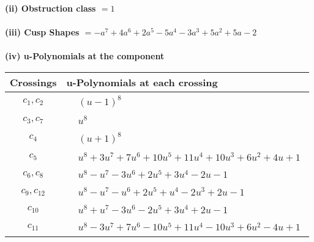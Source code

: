 \documentclass[1p]{elsarticle_modified}
\theoremstyle{definition}
\begin{document}
\flushleft \textbf{(ii) Obstruction class $= 1$}\\~\\
\flushleft \textbf{(iii) Cusp Shapes $= - a^7+4 a^6+2 a^5-5 a^4-3 a^3+5 a^2+5 a-2$}\\~\\
\newpage\renewcommand{\arraystretch}{1}
\flushleft \textbf{(iv) u-Polynomials at the component}\newline \\
\begin{tabular}{m{50pt}|m{274pt}}
Crossings & \hspace{64pt}u-Polynomials at each crossing \\
\hline $$\begin{aligned}c_{1},c_{2}\end{aligned}$$&$\begin{aligned}
&(u-1)^8
\end{aligned}$\\
\hline $$\begin{aligned}c_{3},c_{7}\end{aligned}$$&$\begin{aligned}
&u^8
\end{aligned}$\\
\hline $$\begin{aligned}c_{4}\end{aligned}$$&$\begin{aligned}
&(u+1)^8
\end{aligned}$\\
\hline $$\begin{aligned}c_{5}\end{aligned}$$&$\begin{aligned}
&u^8+3 u^7+7 u^6+10 u^5+11 u^4+10 u^3+6 u^2+4 u+1
\end{aligned}$\\
\hline $$\begin{aligned}c_{6},c_{8}\end{aligned}$$&$\begin{aligned}
&u^8- u^7-3 u^6+2 u^5+3 u^4-2 u-1
\end{aligned}$\\
\hline $$\begin{aligned}c_{9},c_{12}\end{aligned}$$&$\begin{aligned}
&u^8- u^7- u^6+2 u^5+u^4-2 u^3+2 u-1
\end{aligned}$\\
\hline $$\begin{aligned}c_{10}\end{aligned}$$&$\begin{aligned}
&u^8+u^7-3 u^6-2 u^5+3 u^4+2 u-1
\end{aligned}$\\
\hline $$\begin{aligned}c_{11}\end{aligned}$$&$\begin{aligned}
&u^8-3 u^7+7 u^6-10 u^5+11 u^4-10 u^3+6 u^2-4 u+1
\end{aligned}$\\
\hline
\end{tabular}\\~\\
\end{document}
